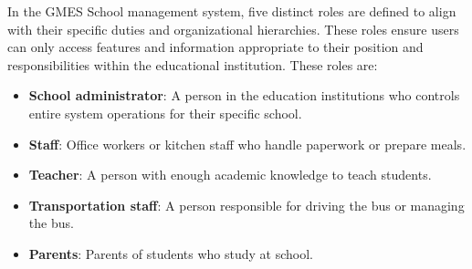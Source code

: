     In the GMES School management system, five distinct roles are defined to align with their specific duties and organizational hierarchies. These roles ensure users can only access features and information appropriate to their position and responsibilities within the educational institution. These roles are: 
    \begin{itemize}[itemsep=-0.1cm, topsep=0.1cm]
        \item \textbf{School administrator}: A person in the education institutions who controls entire system operations for their specific school.  
        \item \textbf{Staff}: Office workers or kitchen staff who handle paperwork or prepare meals.
        \item \textbf{Teacher}: A person with enough academic knowledge to teach students.
        \item \textbf{Transportation staff}: A person responsible for driving the bus or managing the bus.
        \item \textbf{Parents}: Parents of students who study at school.
    \end{itemize}